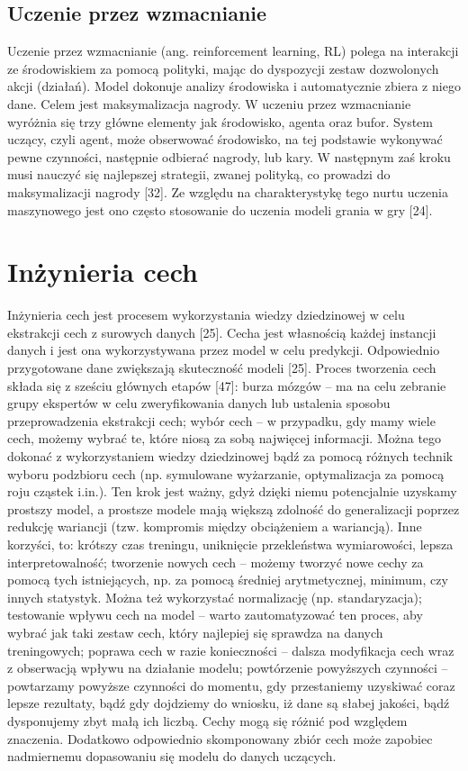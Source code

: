 \subsection{Uczenie przez wzmacnianie}
\label{cha:cha3.2.4}

Uczenie przez wzmacnianie (ang. reinforcement learning, RL) polega na interakcji ze środowiskiem za pomocą polityki, mając do dyspozycji zestaw dozwolonych akcji (działań). Model dokonuje analizy środowiska i automatycznie zbiera z niego dane. Celem jest maksymalizacja nagrody. W uczeniu przez wzmacnianie wyróżnia się trzy główne elementy jak środowisko, agenta oraz bufor. System uczący, czyli agent, może obserwować środowisko, na tej podstawie wykonywać pewne czynności, następnie odbierać nagrody, lub kary. W następnym zaś kroku musi nauczyć się najlepszej strategii, zwanej polityką, co prowadzi do maksymalizacji nagrody [32]. Ze względu na charakterystykę tego nurtu uczenia maszynowego jest ono często stosowanie do uczenia modeli grania w gry [24].

\section{Inżynieria cech}
\label{cha:cha3.3}

Inżynieria cech jest procesem wykorzystania wiedzy dziedzinowej w celu ekstrakcji cech z surowych danych [25]. Cecha jest własnością każdej instancji danych i jest ona wykorzystywana przez model w celu predykcji. Odpowiednio przygotowane dane zwiększają skuteczność modeli [25]. Proces tworzenia cech składa się z sześciu głównych etapów [47]:
burza mózgów – ma na celu zebranie grupy ekspertów w celu zweryfikowania danych lub ustalenia sposobu przeprowadzenia ekstrakcji cech;
wybór cech – w przypadku, gdy mamy wiele cech, możemy wybrać te, które niosą za sobą najwięcej informacji. Można tego dokonać z wykorzystaniem wiedzy dziedzinowej bądź za pomocą różnych technik wyboru podzbioru cech (np. symulowane wyżarzanie, optymalizacja za pomocą roju cząstek i.in.). Ten krok jest ważny, gdyż dzięki niemu potencjalnie uzyskamy prostszy model, a prostsze modele mają większą zdolność do generalizacji poprzez redukcję wariancji (tzw. kompromis między obciążeniem a wariancją). Inne korzyści, to:
krótszy czas treningu,
uniknięcie przekleństwa wymiarowości,
lepsza interpretowalność;
tworzenie nowych cech – możemy tworzyć nowe cechy za pomocą tych istniejących, np. za pomocą średniej arytmetycznej, minimum, czy innych statystyk. Można też wykorzystać normalizację (np. standaryzacja);
testowanie wpływu cech na model – warto zautomatyzować ten proces, aby wybrać jak taki zestaw cech, który najlepiej się sprawdza na danych treningowych;
poprawa cech w razie konieczności – dalsza modyfikacja cech wraz z obserwacją wpływu na działanie modelu;
powtórzenie powyższych czynności – powtarzamy powyższe czynności do momentu, gdy przestaniemy uzyskiwać coraz lepsze rezultaty, bądź gdy dojdziemy do wniosku, iż dane są słabej jakości, bądź dysponujemy zbyt małą ich liczbą.
Cechy mogą się różnić pod względem znaczenia. Dodatkowo odpowiednio skomponowany zbiór cech może zapobiec nadmiernemu dopasowaniu się modelu do danych uczących. 

